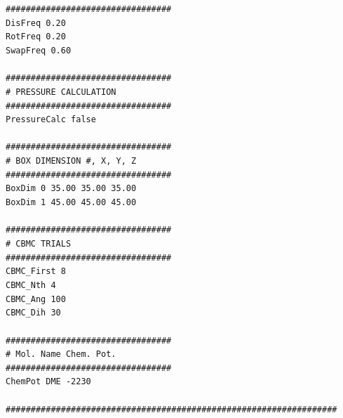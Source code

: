\texttt{\#\#\#\#\#\#\#\#\#\#\#\#\#\#\#\#\#\#\#\#\#\#\#\#\#\#\#\#\#\#\#\#\#}\\
\texttt{DisFreq         	  0.20}\\
\texttt{RotFreq		  0.20}\\
\texttt{SwapFreq	  0.60}\\
\texttt{}\\
\texttt{\#\#\#\#\#\#\#\#\#\#\#\#\#\#\#\#\#\#\#\#\#\#\#\#\#\#\#\#\#\#\#\#\#}\\
\texttt{\# PRESSURE CALCULATION}\\
\texttt{\#\#\#\#\#\#\#\#\#\#\#\#\#\#\#\#\#\#\#\#\#\#\#\#\#\#\#\#\#\#\#\#\#}\\
\texttt{PressureCalc	false}\\
\texttt{}\\
\texttt{\#\#\#\#\#\#\#\#\#\#\#\#\#\#\#\#\#\#\#\#\#\#\#\#\#\#\#\#\#\#\#\#\#}\\
\texttt{\# BOX DIMENSION \#, X, Y, Z}\\
\texttt{\#\#\#\#\#\#\#\#\#\#\#\#\#\#\#\#\#\#\#\#\#\#\#\#\#\#\#\#\#\#\#\#\#}\\
\texttt{BoxDim  0    35.00  35.00  35.00}\\
\texttt{BoxDim  1    45.00  45.00  45.00}\\
\texttt{}\\
\texttt{\#\#\#\#\#\#\#\#\#\#\#\#\#\#\#\#\#\#\#\#\#\#\#\#\#\#\#\#\#\#\#\#\#}\\
\texttt{\# CBMC TRIALS}\\
\texttt{\#\#\#\#\#\#\#\#\#\#\#\#\#\#\#\#\#\#\#\#\#\#\#\#\#\#\#\#\#\#\#\#\#}\\
\texttt{CBMC\_First        8}\\
\texttt{CBMC\_Nth         4}\\
\texttt{CBMC\_Ang     100}\\
\texttt{CBMC\_Dih        30}\\
\texttt{}\\
\texttt{\#\#\#\#\#\#\#\#\#\#\#\#\#\#\#\#\#\#\#\#\#\#\#\#\#\#\#\#\#\#\#\#\#}\\
\texttt{\#          Mol. Name     Chem. Pot.}\\
\texttt{\#\#\#\#\#\#\#\#\#\#\#\#\#\#\#\#\#\#\#\#\#\#\#\#\#\#\#\#\#\#\#\#\#}\\
\texttt{ChemPot    DME             -2230}\\
\texttt{}\\
\texttt{\#\#\#\#\#\#\#\#\#\#\#\#\#\#\#\#\#\#\#\#\#\#\#\#\#\#\#\#\#\#\#\#\#\#\#\#\#\#\#\#\#\#\#\#\#\#\#\#\#\#\#\#\#\#\#\#\#\#\#\#\#\#\#\#\#\#}\\
